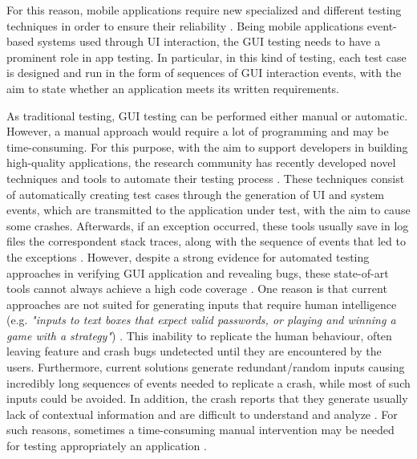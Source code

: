 For this reason, mobile applications require new specialized and different testing techniques in order to ensure their reliability \cite{muccini}. Being mobile applications event-based systems used through UI interaction, the GUI testing needs to have a prominent role in app testing. In particular, in this kind of testing, each test case is designed and run in the form of sequences of GUI interaction events, with the aim to state whether an application meets its written requirements. 

As traditional testing, GUI testing can be performed either manual or automatic. However, a manual approach would require a lot of programming and may be time-consuming. 
For this purpose, with the aim to support developers in building high-quality applications, the research community has recently developed novel techniques and tools to automate their testing process \cite{sapienz, dynodroid ,muccini,Hu:2011:AGT:1982595.1982612}. 
These techniques consist of automatically creating test cases through the generation of UI and system events, which are transmitted to the application under test, with the aim to cause some crashes. Afterwards, if an exception occurred, these tools usually save in log files the correspondent stack traces, along with the sequence of events that led to the exceptions \cite{muccini}. 
However, despite a strong evidence for automated testing approaches in verifying GUI application and revealing bugs, these state-of-art tools cannot always achieve a high code coverage \cite{Nagappan2015}. 
One reason is that current approaches are not suited for generating inputs that require human intelligence (e.g. \textit{"inputs to text boxes that expect valid passwords, or playing and winning a game with a strategy"}) \cite{dynodroid}. This inability to replicate the human behaviour, often leaving feature and crash bugs undetected until they are encountered by the users.
Furthermore, current solutions generate redundant/random inputs causing incredibly long sequences of events needed to replicate a crash, while most of such inputs could be avoided. 
In addition, the crash reports that they generate usually lack of contextual information and are difficult to understand and analyze \cite{Chen, Joorabchi}. 
For such reasons, sometimes a time-consuming manual intervention may be needed for testing appropriately an application \cite{Nagappan2015}. \\
